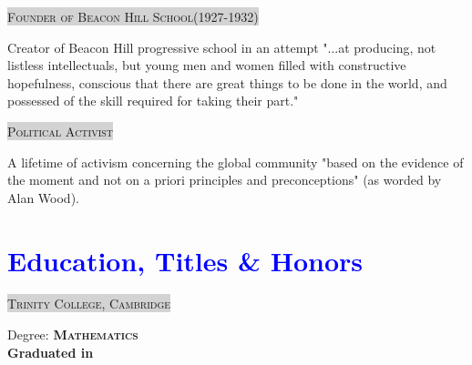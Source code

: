\documentclass[a4paper, oneside, final]{scrartcl}
\begin{document}
\begin{center}
\begin{flushleft}
        \parbox{\textwidth} {
            \colorbox{LightGrey} {
                \textsc{\small{Founder of Beacon Hill School}\tiny{(1927-1932)}}
            }
        } 
        
    \end{flushleft}

    \begin{flushleft}
        \hspace{2em}
		Creator of Beacon Hill progressive school in an attempt "...at producing, not listless intellectuals, but young men and women filled with constructive hopefulness, conscious that there are great things to be done in the world, and possessed of the skill required for taking their part."
    \end{flushleft}

    \begin{flushleft}
        
        \parbox{\textwidth} {
            \colorbox{LightGrey} {
                \textsc{\small{Political Activist}}
            }
        } 
        
    \end{flushleft}

    \begin{flushleft}
        \hspace{2em}
		A lifetime of activism concerning the global community "based on the evidence of the moment and not on a priori principles and preconceptions" (as worded by Alan Wood).
    \end{flushleft}

\section{\textcolor{blue}{Education, Titles \& Honors}} 

    \begin{multicols}{2}

        \parbox{\columnwidth} {
            \colorbox{LightGrey} {
                \textsc{\small{Trinity College, Cambridge}}
            }
        }

        \begin{flushleft}
            \small{Degree}: \bf{\textsc{Mathematics}} \\
            \small{\bf{Graduated in}} \textsc{\bf{}} \\ 
        \end{flushleft}


\end{multicols}
\end{center}
\end{document}
